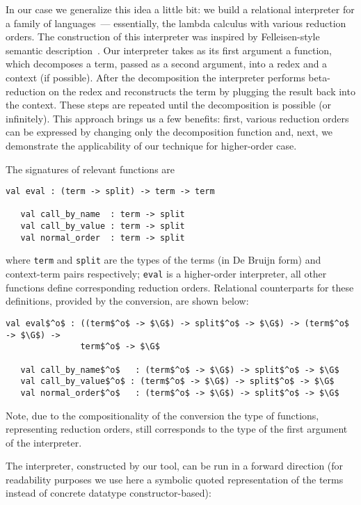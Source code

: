 In our case we generalize this idea a little bit: we build a relational interpreter for a family of languages~--- essentially, the lambda calculus with
various reduction orders. The construction of this interpreter was inspired by Felleisen-style semantic description~\cite{Felleisen}. 
Our interpreter takes as its first argument a function, which decomposes a term, passed as a second argument, into a redex and a context (if possible). 
After the decomposition the interpreter performs beta-reduction on the redex and reconstructs the term by plugging the result back into the context. 
These steps are repeated until the decomposition is possible (or infinitely). This approach brings us a few benefits: first, various reduction orders can be 
expressed by changing only the decomposition function and, next, we demonstrate the applicability of our technique for higher-order case.

The signatures of relevant functions are

\begin{lstlisting}[basicstyle=\small]
   val eval : (term -> split) -> term -> term

   val call_by_name  : term -> split
   val call_by_value : term -> split
   val normal_order  : term -> split
\end{lstlisting}

\noindent where \lstinline|term| and \lstinline|split| are the types of the terms (in De Bruijn form) and context-term pairs respectively; \lstinline|eval| 
is a higher-order interpreter, all other functions define corresponding reduction orders. Relational counterparts for these definitions, provided 
by the conversion, are shown below:

\begin{lstlisting}[basicstyle=\small]
   val eval$^o$ : ((term$^o$ -> $\G$) -> split$^o$ -> $\G$) -> (term$^o$ -> $\G$) -> 
               term$^o$ -> $\G$

   val call_by_name$^o$   : (term$^o$ -> $\G$) -> split$^o$ -> $\G$
   val call_by_value$^o$ : (term$^o$ -> $\G$) -> split$^o$ -> $\G$
   val normal_order$^o$   : (term$^o$ -> $\G$) -> split$^o$ -> $\G$
\end{lstlisting}

Note, due to the compositionality of the conversion the type of functions, representing reduction orders, still corresponds to the type of the first 
argument of the interpreter.

The interpreter, constructed by our tool, can be run in a forward direction (for readability purposes we use here a symbolic quoted representation of
the terms instead of concrete datatype constructor-based):

